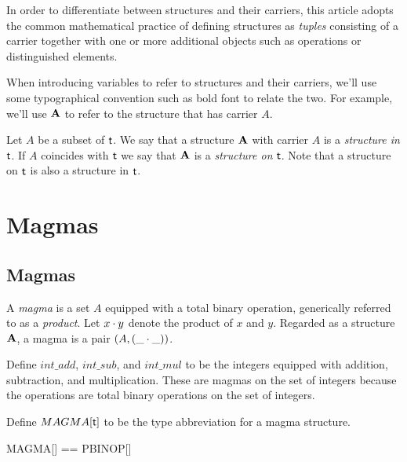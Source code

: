 \documentclass{amsart}
\begin{document}
In order to differentiate between structures and their carriers, 
this article adopts the common mathematical practice of defining structures as \textit{tuples}
consisting of a carrier together with one or more additional objects such as operations or
distinguished elements.

When introducing variables to refer to structures and their carriers,
we'll use some typographical convention such as bold font to relate the two.
For example, we'll use $\mathbf{A}$ to refer to the structure that has carrier $A$.

Let $A$ be a subset of $\mathsf{t}$.
We say that a structure $\mathbf{A}$ with carrier $A$ is a \textit{structure in} $\mathsf{t}$.
If $A$ coincides with $\mathsf{t}$ we say that $\mathbf{A}$ is a \textit{structure on} $\mathsf{t}$.
Note that a structure on $\mathsf{t}$ is also a structure in $\mathsf{t}$.

\section{Magmas}

\subsection{Magmas}

A \textit{magma} is a set $A$ equipped with a total binary operation, 
generically referred to as a \textit{product}.
Let $x \mathbin{\cdot} y$ denote the product of $x$ and $y$.
Regarded as a structure $\mathbf{A}$, a magma is a pair $(A, (\_ \mathbin{\cdot} \_))$.

\begin{example}

Define $int\_add$, $int\_sub$, and $int\_mul$ to be the integers equipped with addition,
subtraction, and multiplication. 
These are magmas on the set of integers because the operations are total
binary operations on the set of integers.


\end{example}

Define $MAGMA[\mathsf{t}]$ to be the type abbreviation for a magma structure.

\begin{zed}
	MAGMA[\genT] == \power \genT \cross PBINOP[\genT]
\end{zed}
\end{document}
